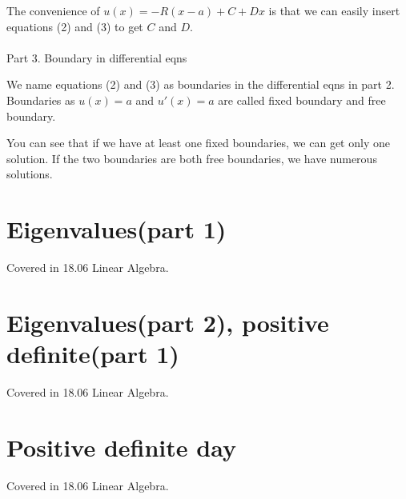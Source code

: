 \documentclass{article}
\begin{document}
\begin{spacing}{1.5}
The convenience of $u(x) = -R(x-a) + C + Dx$ is that we can easily insert equations (2) and (3) to get $C$ and $D$.
\\\\Part 3. Boundary in differential eqns

We name equations (2) and (3) as boundaries in the differential eqns in part 2. Boundaries as $u(x)=a$ and $u'(x)=a$ are called fixed boundary and free boundary.

You can see that if we have at least one fixed boundaries, we can get only one solution. If the two boundaries are both free boundaries, we have numerous solutions.

\section{Eigenvalues(part 1)}
Covered in 18.06 Linear Algebra.

\section{Eigenvalues(part 2), positive definite(part 1)}
Covered in 18.06 Linear Algebra.

\section{Positive definite day}
Covered in 18.06 Linear Algebra.

\end{spacing}
\end{document}
